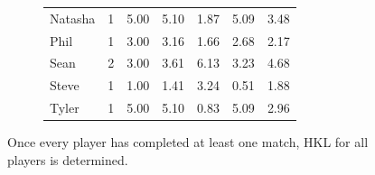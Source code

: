 \documentclass[letterpaper, 10 pt, conference]{ieeeconf}  %
\begin{document}
\begin{figure}[h!b]
\begin{subfigure}[hb]{0.4\textwidth}
\begin{tabular}{lccc|ccc}
                        Natasha	& 1	& 5.00  & 5.10 & 1.87 & 5.09 & 3.48 \\
                        Phil	& 1	& 3.00	& 3.16 & 1.66 & 2.68 & 2.17 \\
                        Sean	& 2	& 3.00	& 3.61 & 6.13 & 3.23 & 4.68 \\
                        Steve	& 1	& 1.00 	& 1.41 & 3.24 & 0.51 & 1.88 \\
                        Tyler	& 1	& 5.00  & 5.10 & 0.83 & 5.09 & 2.96 \\
                        \bottomrule
                \end{tabular}
        \end{subfigure}
        \caption{Once every player has completed at least one match, HKL for all 
                 players is determined.}
\end{figure}
\clearpage
\end{document}
